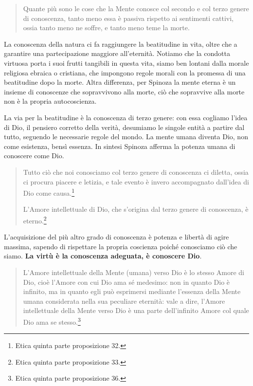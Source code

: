 \begin{quotation}
	\small Quante più sono le cose che la Mente conosce col secondo e col terzo genere di conoscenza, tanto meno essa è passiva rispetto ai sentimenti cattivi, ossia tanto meno ne soffre, e
	tanto meno teme la morte.
\end{quotation}

La conoscenza della natura ci fa raggiungere la beatitudine in vita, oltre che a garantire una partecipazione maggiore all'eternità. Notiamo che la condotta virtuosa porta i suoi frutti tangibili in questa vita, siamo ben lontani dalla morale religiosa ebraica o cristiana, che impongono regole morali con la promessa di una beatitudine dopo la morte. Altra differenza, per Spinoza la mente eterna è un insieme di conoscenze che sopravvivono alla morte, ciò che sopravvive alla morte non è la propria autocoscienza.

La via per la beatitudine è la conoscenza di terzo genere: con essa cogliamo l'idea di Dio, il pensiero corretto della verità, desumiamo le singole entità a partire dal tutto, seguendo le necessarie regole del mondo. La mente umana diventa Dio, non come esistenza, bensì essenza. In sintesi Spinoza afferma la potenza umana di conoscere come Dio.

\begin{quotation}
	\small Tutto ciò che noi conosciamo col terzo genere di conoscenza ci diletta, ossia ci procura
	piacere e letizia, e tale evento è invero accompagnato dall’idea di Dio come causa.\footnote{Etica quinta parte proposizione 32.}
	
	L’Amore intellettuale di Dio, che s’origina dal terzo genere di conoscenza, è eterno.\footnote{Etica quinta parte proposizione 33.}
\end{quotation}

L'acquisizione del più altro grado di conoscenza è potenza e libertà di agire massima, sapendo di rispettare la propria coscienza poiché conosciamo ciò che siamo. \textbf{La virtù è la conoscenza adeguata, è conoscere Dio}.

\begin{quotation}
	\small L’Amore intellettuale della Mente (umana) verso Dio è lo stesso Amore di Dio, cioè l’Amore con
	cui Dio ama sé medesimo: non in quanto Dio è infinito, ma in quanto egli può esprimersi mediante l’essenza della Mente umana considerata nella sua peculiare eternità:
	vale a dire, l’Amore intellettuale della Mente verso Dio è una parte dell’infinito Amore col
	quale Dio ama se stesso.\footnote{Etica quinta parte proposizione 36.}
\end{quotation}

